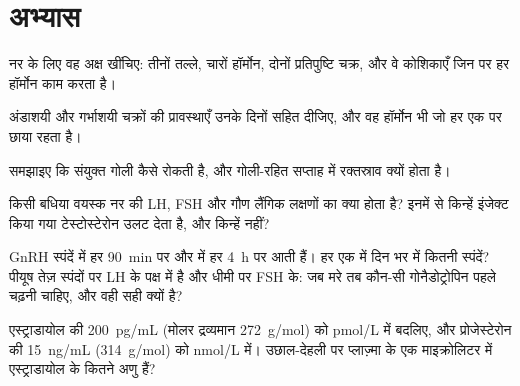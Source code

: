 \section{अभ्यास}

\begin{exercise}[$\star$]\label{exo:b2:reproductive-hormones:1}
नर के लिए वह अक्ष खींचिए: तीनों तल्ले, चारों हॉर्मोन, दोनों
प्रतिपुष्टि चक्र, और वे कोशिकाएँ जिन पर हर हॉर्मोन काम करता है।
\end{exercise}

\begin{exercise}[$\star$]\label{exo:b2:reproductive-hormones:2}
अंडाशयी और गर्भाशयी चक्रों की प्रावस्थाएँ उनके दिनों सहित दीजिए, और
वह हॉर्मोन भी जो हर एक पर छाया रहता है।
\end{exercise}

\begin{exercise}[$\star$]\label{exo:b2:reproductive-hormones:3}
समझाइए कि संयुक्त गोली  कैसे रोकती है, और गोली-रहित सप्ताह
में रक्तस्राव क्यों होता है।
\end{exercise}

\begin{exercise}[$\star$]\label{exo:b2:reproductive-hormones:4}
किसी बधिया वयस्क नर की LH, FSH और गौण लैंगिक लक्षणों का क्या होता है?
इनमें से किन्हें इंजेक्ट किया गया टेस्टोस्टेरोन उलट देता है, और
किन्हें नहीं?
\end{exercise}

\begin{exercise}[$\star\star$]\label{exo:b2:reproductive-hormones:5}
GnRH स्पंदें  में हर \qty{90}{min} पर और
 में हर \qty{4}{h} पर आती हैं। हर एक में दिन भर में कितनी स्पंदें?
पीयूष तेज़ स्पंदों पर LH के पक्ष में है और धीमी पर FSH के: जब
 मरे तब कौन-सी गोनैडोट्रोपिन पहले चढ़नी चाहिए, और
वही सही क्यों है?
\end{exercise}

\begin{exercise}[$\star\star$]\label{exo:b2:reproductive-hormones:6}
एस्ट्राडायोल की \qty{200}{pg/mL} (मोलर द्रव्यमान
\qty{272}{g/mol}) को \unit{pmol/L} में बदलिए, और
प्रोजेस्टेरोन की \qty{15}{ng/mL} (\qty{314}{g/mol}) को \unit{nmol/L} में।
उछाल-देहली पर प्लाज़्मा के एक माइक्रोलिटर में एस्ट्राडायोल के कितने
अणु हैं?
\end{exercise}

